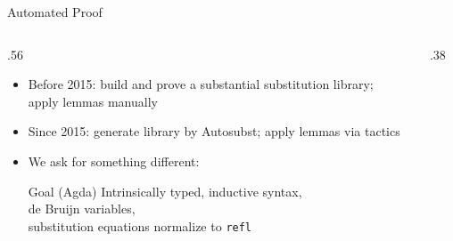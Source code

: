 \documentclass[pdftex,aspectratio=169]{beamer}
\newcommand{\refl}{\texttt{refl}}
\begin{document}
\begin{frame}{Automated Proof}
  \begin{columns}[c,onlytextwidth]
    \begin{column}{.56\textwidth}
      \begin{itemize}
        \item Before 2015: build and prove a substantial substitution library;
          \\
          apply lemmas manually
        \item Since 2015: generate library by Autosubst; apply lemmas via tactics
        \item We ask for something different:
      \begin{block}{Goal (Agda)}
        Intrinsically typed, inductive syntax, \\
        de Bruijn variables, \\substitution equations normalize
        to \refl{}
      \end{block}
      \end{itemize}
      \vspace{.4em}
    \end{column}
    \begin{column}{.38\textwidth}
      \centering
    \end{column}
  \end{columns}
\end{frame}
\end{document}
